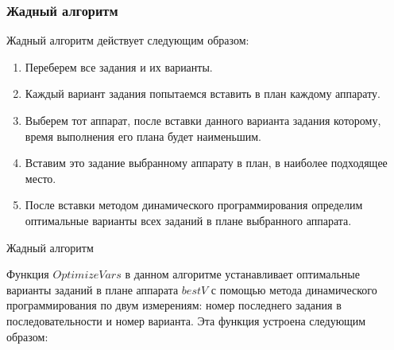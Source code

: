 \documentclass[a4paper,14pt,russian]{article}
\begin{document}
\subsubsection{Жадный алгоритм}
Жадный алгоритм действует следующим образом:
\begin{enumerate}
\item Переберем все задания и их варианты.
\item Каждый вариант задания попытаемся вставить в план каждому аппарату.
\item Выберем тот аппарат, после вставки данного варианта задания которому, время выполнения его плана будет наименьшим.
\item Вставим это задание выбранному аппарату в план, в наиболее подходящее место.
\item После вставки методом динамического программирования определим оптимальные варианты всех заданий в плане выбранного аппарата.
\end{enumerate}


\begin{algorithm}
\caption{Жадный алгоритм}\label{alg:greedy}
\end{algorithm}

Функция $OptimizeVars$ в данном алгоритме устанавливает оптимальные варианты заданий в плане аппарата $bestV$ с помощью метода динамического программирования по двум измерениям: номер последнего задания в последовательности и номер варианта. Эта функция устроена следующим образом:

\pagebreak
\end{document}
